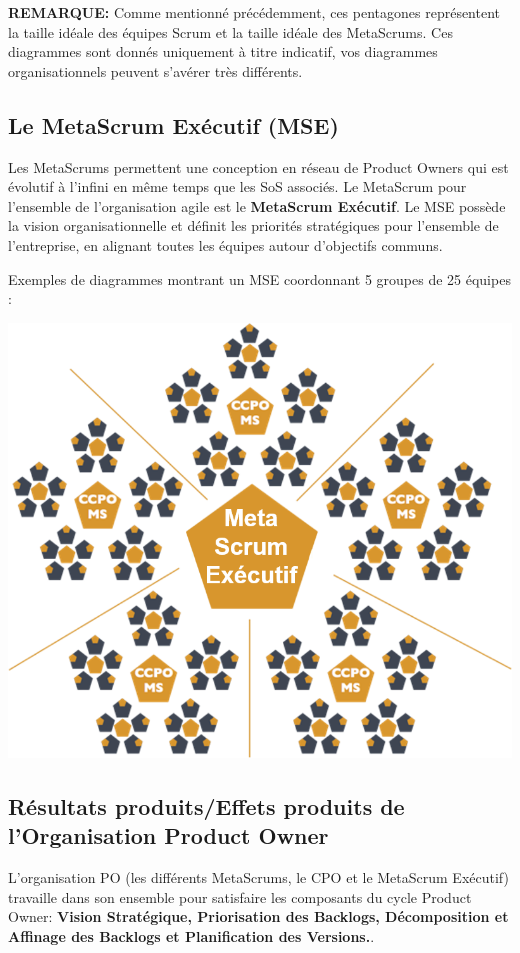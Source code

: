 \documentclass[12pt,a4paper,parskip=full]{scrartcl}
\begin{document}
\textbf{REMARQUE:} Comme mentionné précédemment, ces pentagones représentent la taille
idéale des équipes Scrum et la taille idéale des MetaScrums. Ces diagrammes sont
donnés uniquement à titre indicatif, vos diagrammes organisationnels peuvent s’avérer
très différents.

\subsection{Le MetaScrum Exécutif (MSE)}
Les MetaScrums permettent une conception en réseau de Product Owners qui est
évolutif à l'infini en même temps que les SoS associés. Le MetaScrum pour l'ensemble
de l'organisation agile est le \textbf{MetaScrum Exécutif}. Le MSE possède la vision
organisationnelle et définit les priorités stratégiques pour l'ensemble de l'entreprise, en
alignant toutes les équipes autour d'objectifs communs.

Exemples de diagrammes montrant un MSE coordonnant 5 groupes de 25 équipes :

\includegraphics[width=1.0\linewidth]{MetaScrumExecutif.png}

\subsection{Résultats produits/Effets produits de l’Organisation Product
Owner}
L'organisation PO (les différents MetaScrums, le CPO et le MetaScrum Exécutif)
travaille dans son ensemble pour satisfaire les composants du cycle Product Owner:
\textbf{Vision Stratégique, Priorisation des Backlogs, Décomposition et Affinage des
Backlogs et Planification des Versions.}.
\end{document}
